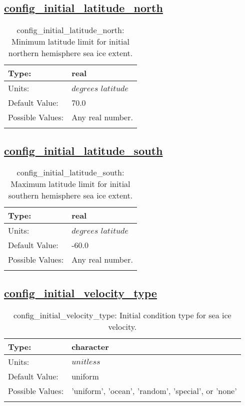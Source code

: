 \subsection[config\_initial\_latitude\_north]{\hyperref[sec:nm_tab_initialize]{config\_initial\_latitude\_north}}
\label{subsec:nm_sec_config_initial_latitude_north}
\begin{center}
\begin{longtable}{| p{2.0in} || p{4.0in} |}
    \hline
    Type: & real \\
    \hline
    Units: & $degrees$ $latitude$ \\
    \hline
    Default Value: & 70.0 \\
    \hline
    Possible Values: & Any real number. \\
    \hline
    \caption{config\_initial\_latitude\_north: Minimum latitude limit for initial northern hemisphere sea ice extent.}
\end{longtable}
\end{center}
\subsection[config\_initial\_latitude\_south]{\hyperref[sec:nm_tab_initialize]{config\_initial\_latitude\_south}}
\label{subsec:nm_sec_config_initial_latitude_south}
\begin{center}
\begin{longtable}{| p{2.0in} || p{4.0in} |}
    \hline
    Type: & real \\
    \hline
    Units: & $degrees$ $latitude$ \\
    \hline
    Default Value: & -60.0 \\
    \hline
    Possible Values: & Any real number. \\
    \hline
    \caption{config\_initial\_latitude\_south: Maximum latitude limit for initial southern hemisphere sea ice extent.}
\end{longtable}
\end{center}
\subsection[config\_initial\_velocity\_type]{\hyperref[sec:nm_tab_initialize]{config\_initial\_velocity\_type}}
\label{subsec:nm_sec_config_initial_velocity_type}
\begin{center}
\begin{longtable}{| p{2.0in} || p{4.0in} |}
    \hline
    Type: & character \\
    \hline
    Units: & $unitless$ \\
    \hline
    Default Value: & uniform \\
    \hline
    Possible Values: & 'uniform', 'ocean', 'random', 'special', or 'none' \\
    \hline
    \caption{config\_initial\_velocity\_type: Initial condition type for sea ice velocity.}
\end{longtable}
\end{center}
